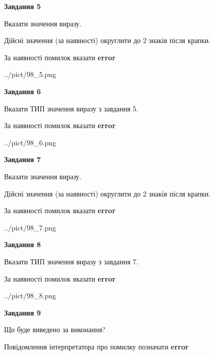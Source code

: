 \documentclass[11pt, ukrainian]{article}
\begin{document}
{\begin {large}
{\begin {center}\textbf{Завдання 5}\end {center}}\par
Вказати значення виразу. \par
Дійсні значення (за наявності) округлити до 2 знаків після крапки. \par
За наявності помилок вказати \textbf{error}

\begin{center}
	{../pict/98_5.png}
\end{center}
\newpage

{\begin {center}\textbf{Завдання 6}\end {center}}\par
Вказати ТИП значення виразу з завдання 5. \par
За наявності помилок вказати \textbf{error}

\begin{center}
	{../pict/98_6.png}
\end{center}
\newpage

{\begin {center}\textbf{Завдання 7}\end {center}}\par
Вказати значення виразу. \par
Дійсні значення (за наявності) округлити до 2 знаків після крапки. \par
За наявності помилок вказати \textbf{error}

\begin{center}
	{../pict/98_7.png}
\end{center}
\newpage

{\begin {center}\textbf{Завдання 8}\end {center}}\par
Вказати ТИП значення виразу з завдання 7. \par
За наявності помилок вказати \textbf{error}

\begin{center}
	{../pict/98_8.png}
\end{center}
\newpage

{\begin {center}\textbf{Завдання 9}\end {center}}\par
Що буде виведено за виконання? \par
Повідомлення інтерпретатора про помилку позначати \textbf{error}


\end{large}}
\end{document}
